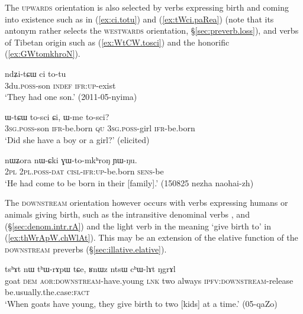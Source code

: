 The \textsc{upwards} orientation is also selected by verbs expressing birth and coming into existence such as  in (\ref{ex:ci.totu}) and (\ref{ex:tWci.paRea}) (note that its antonym  rather selects the \textsc{westwards} orientation, §\ref{sec:preverb.loss}), and verbs of Tibetan origin such as  (\ref{ex:WtCW.tosci}) and the honorific  (\ref{ex:GWtomkhroN}).

\begin{exe}
\ex \label{ex:ci.totu}
\gll  ndʑi-tɕɯ ci to-tu \\
3du.\textsc{poss}-son \textsc{indef} \textsc{ifr}:\textsc{up}-exist \\
\glt `They had one son.' (2011-05-nyima)
\end{exe}

\begin{exe}
\ex \label{ex:WtCW.tosci}
\gll ɯ-tɕɯ to-sci ɕi, ɯ-me to-sci? \\
\textsc{3sg}.\textsc{poss}-son \textsc{ifr}-be.born \textsc{qu} \textsc{3sg}.\textsc{poss}-girl \textsc{ifr}-be.born \\
\glt `Did she have a boy or a girl?' (elicited)
\end{exe}

\begin{exe}
\ex \label{ex:GWtomkhroN}
\gll nɯʑora nɯ-ɕki ɣɯ-to-mkʰroŋ ɲɯ-ŋu.  \\
\textsc{2pl} \textsc{2pl}.\textsc{poss}-\textsc{dat} \textsc{cisl}-\textsc{ifr}:\textsc{up}-be.born \textsc{sens}-be \\
\glt `He had come to be born in their [family].' (150825 nezha naohai-zh) 
\end{exe}

The \textsc{downstream} orientation however occurs with verbs expressing humans or animals giving birth, such as the intransitive denominal verbs ,  and  (§\ref{sec:denom.intr.rA}) and the light verb  in the meaning `give birth to' in (\ref{ex:thWrApW.chWlAt}). This may be an extension of the elative function of the \textsc{downstream} preverbs (§\ref{sec:illative.elative}).

\begin{exe}
\ex \label{ex:thWrApW.chWlAt}
\gll tsʰɤt nɯ tʰɯ-rɤpɯ tɕe, ʁnɯz ntsɯ cʰɯ-lɤt ŋgrɤl \\
goat \textsc{dem} \textsc{aor}:\textsc{downstream}-have.young \textsc{lnk} two always \textsc{ipfv}:\textsc{downstream}-release be.usually.the.case:\textsc{fact} \\
\glt `When goats have young, they give birth to two [kids] at a time.' (05-qaZo)
\end{exe}

